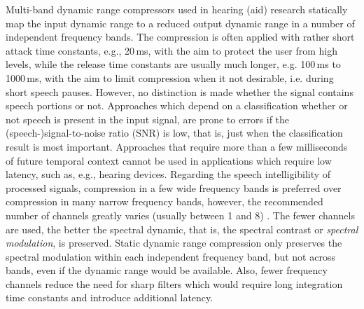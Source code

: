 \documentclass[10pt,a4paper,twocolumn]{article}
\begin{document}
Multi-band dynamic range compressors used in hearing (aid) research \cite[e.g. ][]{grimm2015} statically map the input dynamic range to a reduced output dynamic range in a number of independent frequency bands.
%
The compression is often applied with rather short attack time constants, e.g., 20\,ms, with the aim to protect the user from high levels, while the release time constants are usually much longer, e.g. 100\,ms to 1000\,ms, with the aim to limit compression when it not desirable, i.e. during short speech pauses.
%
However, no distinction is made whether the signal contains speech portions or not.
%
Approaches which depend on a classification whether or not speech is present in the input signal, are prone to errors if the (speech-)signal-to-noise ratio (SNR) is low, that is, just when the classification result is most important.
%
Approaches that require more than a few milliseconds of future temporal context cannot be used in applications which require low latency, such as, e.g., hearing devices.
%
Regarding the speech intelligibility of processed signals, compression in a few wide frequency bands is preferred over compression in many narrow frequency bands, however, the recommended number of channels greatly varies (usually between 1 and 8) \citep{plomp1988,dreschler1992,hohmann1995,yund1995,moore1999,souza2002}.
%
The fewer channels are used, the better the spectral dynamic, that is, the spectral contrast or \emph{spectral modulation}, is preserved.
%
Static dynamic range compression only preserves the spectral modulation within each independent frequency band, but not across bands, even if the dynamic range would be available.
%
Also, fewer frequency channels reduce the need for sharp filters which would require long integration time constants and introduce additional latency.
\end{document}
